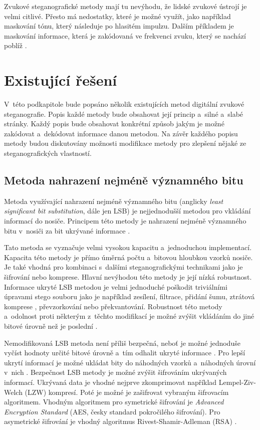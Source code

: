 Zvukové steganografické metody mají tu nevýhodu, že lidské zvukové ústrojí je
velmi citlivé. Přesto má nedostatky, které je možné využít, jako například
maskování tónu, který následuje po hlasitém impulzu. Dalším příkladem je
maskování informace, která je zakódovaná ve frekvenci zvuku, který se nachází
poblíž \cite{Dutta2020}.

\section{Existující řešení}
\label{sec:existing-methods}

V~této podkapitole bude popsáno několik existujících metod digitální zvukové
steganografie. Popis každé metody bude obsahovat její princip a~silné a~slabé
stránky. Každý popis bude obsahovat konkrétní způsob jakým je možné zakódovat
a~dekódovat informace danou metodou. Na závěr každého popisu metody budou
diskutovány možnosti modifikace metody pro zlepšení nějaké ze steganografických
vlastností.

\subsection*{Metoda nahrazení nejméně významného bitu}
\label{sub:lsb}

Metoda využívající nahrazení nejméně významného bitu (anglicky \textit{least
significant bit substitution}, dále jen LSB) je nejjednodušší metodou pro
vkládání informací do nosiče. Principem této metody je nahrazení nejméně
významného bitu v~nosiči za bit ukrývané informace \cite{Dutta2020}.

Tato metoda se vyznačuje velmi vysokou kapacitu \cite{Djebbar2012}
a~jednoduchou implementací. Kapacita této metody je přímo úměrná počtu
a~bitovou hloubkou vzorků nosiče. Je také vhodná pro kombinaci s~dalšími
steganografickými technikami \cite{Djebbar2012} jako je šifrování nebo
komprese. Hlavní nevýhodou této metody je její nízká robustnost. Informace
ukryté LSB metodou je velmi jednoduché poškodit triviálními úpravami stego
souboru jako je například zesílení, filtrace, přidání šumu, ztrátová komprese
\cite{Djebbar2012}, převzorkování nebo překvantování. Robustnost této metody
a~odolnost proti některým z~těchto modifikací je možné zvýšit vkládáním do jiné
bitové úrovně než je poslední \cite{Djebbar2012}.

Nemodifikovaná LSB metoda není příliš bezpečná, neboť je možné jednoduše vyčíst
hodnoty určité bitové úrovně a~tím odhalit ukryté informace \cite{Djebbar2012}.
Pro lepší ukrytí informací je možné ukládat bity do náhodných vzorků
a~náhodných úrovní v~nich \cite{Dutta2020}. Bezpečnost LSB metody je možné
zvýšit šifrováním ukrývaných informací. Ukrývaná data je vhodné nejprve
zkomprimovat například Lempel-Ziv-Welch (LZW) kompresí. Poté je možné je
zašifrovat vybraným šifrovacím algoritmem. Vhodným algoritmem pro symetrické
šifrování je \textit{Advanced Encryption Standard} (AES, česky standard
pokročilého šifrování). Pro asymetrické šifrování je vhodný algoritmus
Rivest-Shamir-Adleman (RSA) \cite{Dutta2020}.


